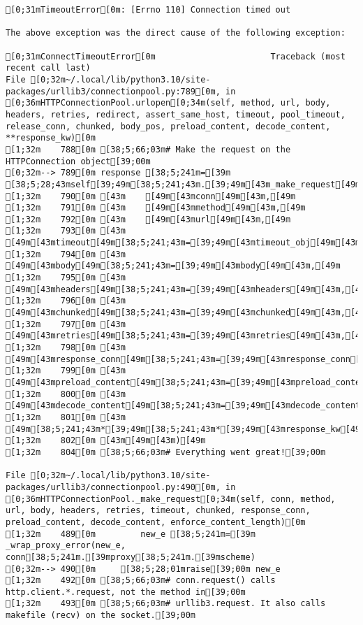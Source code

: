 \documentclass[
  a4paper,
  portrait]{book}
\begin{document}
\begin{verbatim}
[0;31mTimeoutError[0m: [Errno 110] Connection timed out

The above exception was the direct cause of the following exception:

[0;31mConnectTimeoutError[0m                       Traceback (most recent call last)
File [0;32m~/.local/lib/python3.10/site-packages/urllib3/connectionpool.py:789[0m, in [0;36mHTTPConnectionPool.urlopen[0;34m(self, method, url, body, headers, retries, redirect, assert_same_host, timeout, pool_timeout, release_conn, chunked, body_pos, preload_content, decode_content, **response_kw)[0m
[1;32m    788[0m [38;5;66;03m# Make the request on the HTTPConnection object[39;00m
[0;32m--> 789[0m response [38;5;241m=[39m [38;5;28;43mself[39;49m[38;5;241;43m.[39;49m[43m_make_request[49m[43m([49m
[1;32m    790[0m [43m    [49m[43mconn[49m[43m,[49m
[1;32m    791[0m [43m    [49m[43mmethod[49m[43m,[49m
[1;32m    792[0m [43m    [49m[43murl[49m[43m,[49m
[1;32m    793[0m [43m    [49m[43mtimeout[49m[38;5;241;43m=[39;49m[43mtimeout_obj[49m[43m,[49m
[1;32m    794[0m [43m    [49m[43mbody[49m[38;5;241;43m=[39;49m[43mbody[49m[43m,[49m
[1;32m    795[0m [43m    [49m[43mheaders[49m[38;5;241;43m=[39;49m[43mheaders[49m[43m,[49m
[1;32m    796[0m [43m    [49m[43mchunked[49m[38;5;241;43m=[39;49m[43mchunked[49m[43m,[49m
[1;32m    797[0m [43m    [49m[43mretries[49m[38;5;241;43m=[39;49m[43mretries[49m[43m,[49m
[1;32m    798[0m [43m    [49m[43mresponse_conn[49m[38;5;241;43m=[39;49m[43mresponse_conn[49m[43m,[49m
[1;32m    799[0m [43m    [49m[43mpreload_content[49m[38;5;241;43m=[39;49m[43mpreload_content[49m[43m,[49m
[1;32m    800[0m [43m    [49m[43mdecode_content[49m[38;5;241;43m=[39;49m[43mdecode_content[49m[43m,[49m
[1;32m    801[0m [43m    [49m[38;5;241;43m*[39;49m[38;5;241;43m*[39;49m[43mresponse_kw[49m[43m,[49m
[1;32m    802[0m [43m[49m[43m)[49m
[1;32m    804[0m [38;5;66;03m# Everything went great![39;00m

File [0;32m~/.local/lib/python3.10/site-packages/urllib3/connectionpool.py:490[0m, in [0;36mHTTPConnectionPool._make_request[0;34m(self, conn, method, url, body, headers, retries, timeout, chunked, response_conn, preload_content, decode_content, enforce_content_length)[0m
[1;32m    489[0m         new_e [38;5;241m=[39m _wrap_proxy_error(new_e, conn[38;5;241m.[39mproxy[38;5;241m.[39mscheme)
[0;32m--> 490[0m     [38;5;28;01mraise[39;00m new_e
[1;32m    492[0m [38;5;66;03m# conn.request() calls http.client.*.request, not the method in[39;00m
[1;32m    493[0m [38;5;66;03m# urllib3.request. It also calls makefile (recv) on the socket.[39;00m


\end{verbatim}
\end{document}
